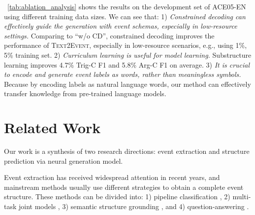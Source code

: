 \documentclass[11pt,a4paper]{article}
\newcommand\modelname{\textsc{Text2Event}}
\begin{document}
\tablename~\ref{tab:ablation_analysis} shows the results on the development set of ACE05-EN using different training data sizes.
We can see that:
1) \textit{Constrained decoding can effectively guide the generation with event schemas, especially in low-resource settings.}
Comparing to ``w/o CD'', constrained decoding improves the performance of \modelname, especially in low-resource scenarios, e.g., using 1\%, 5\% training set.
2) \textit{Curriculum learning is useful for model learning.}
Substructure learning improves 4.7\% Trig-C F1 and 5.8\% Arg-C F1 on average.
3) \textit{It is crucial to encode and generate event labels as words, rather than meaningless symbols.}
Because by encoding labels as natural language words, our method can effectively transfer knowledge from pre-trained language models.
 
\section{Related Work} \label{sec:relatedwork}
Our work is a synthesis of two research directions: event extraction and structure prediction via neural generation model.

Event extraction has received widespread attention in recent years, and mainstream methods usually use different strategies to obtain a complete event structure.
These methods can be divided into: 
1) pipeline classification \citep{ahn:2006:ARTE,Ji-and-Grishman:2008:ACL2008,liao-grishman-2010-using,hong-etal-2011-using,hong-etal-2018-self,huang-riloff:2012:aaai,chen-etal-2015-event,sha-etal-2016-rbpb,lin-etal-2018-nugget,yang-etal-2019-exploring-pre,wang-etal-2019-hmeae,ma-etal-2020-resource,zhang-etal-2020-two},
2) multi-task joint models \citep{mcclosky-etal-2011-event,li-etal-2013-joint,li-etal-2014-constructing,yang-mitchell:2016:N16-1,nguyen-cho-grishman:2016:N16-1,liu-etal-2018-jointly,zhang-etal:2019:IJCAI,zheng-etal-2019-doc2edag}, 
3) semantic structure grounding \citep{huang-etal-2016-liberal,huang-etal-2018-zero,zhang2020unsupervised},
and 4) question-answering \citep{chen-etal-2020-reading,du-cardie-2020-event,li-etal-2020-event,liu-etal-2020-event}.
\end{document}

